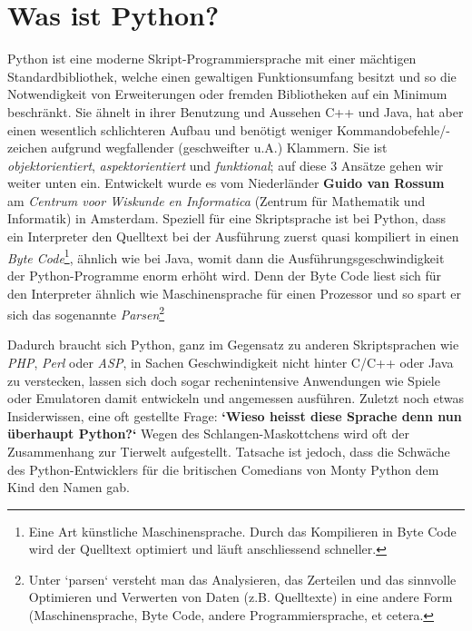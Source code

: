 \documentclass[b5paper,10pt,dvips,fleqn,titlepage,twoside]{book}
\begin{document}
\section{Was ist Python?}
Python ist eine moderne Skript-Programmiersprache mit einer mächtigen Standardbibliothek, welche einen gewaltigen Funktionsumfang besitzt und so die Notwendigkeit von Erweiterungen oder fremden Bibliotheken auf ein Minimum beschränkt. Sie ähnelt in ihrer Benutzung und Aussehen C++ und Java, hat aber einen wesentlich schlichteren Aufbau und benötigt weniger Kommandobefehle/-zeichen aufgrund wegfallender (geschweifter u.A.) Klammern.\newline
Sie ist \emph{objektorientiert}, \emph{aspektorientiert} und \emph{funktional}; auf diese 3 Ansätze gehen wir weiter unten ein.
Entwickelt wurde es vom Niederländer \textbf{Guido van Rossum} am \emph{Centrum voor Wiskunde en Informatica} (Zentrum für Mathematik und Informatik) in Amsterdam.\newline
Speziell für eine Skriptsprache ist bei Python, dass ein Interpreter den Quelltext bei der Ausführung zuerst quasi kompiliert in einen \emph{Byte Code}\footnote{Eine Art künstliche Maschinensprache. Durch das Kompilieren in Byte Code wird der Quelltext optimiert und läuft anschliessend schneller.}, ähnlich wie bei Java, womit dann die Ausführungsgeschwindigkeit der Python-Programme enorm erhöht wird. Denn der Byte Code liest sich für den Interpreter ähnlich wie Maschinensprache für einen Prozessor und so spart er sich das sogenannte \emph{Parsen}\footnote{Unter `parsen` versteht man das Analysieren, das Zerteilen und das sinnvolle Optimieren und Verwerten von Daten (z.B. Quelltexte) in eine andere Form (Maschinensprache, Byte Code, andere Programmiersprache, et cetera.}\newline

Dadurch braucht sich Python, ganz im Gegensatz zu anderen Skriptsprachen wie \emph{PHP}, \emph{Perl} oder \emph{ASP}, in Sachen Geschwindigkeit nicht hinter C/C++ oder Java zu verstecken, lassen sich doch sogar rechenintensive Anwendungen wie Spiele oder Emulatoren damit entwickeln und angemessen ausführen.\newline
Zuletzt noch etwas Insiderwissen, eine oft gestellte Frage: \textbf{`Wieso heisst diese Sprache denn nun überhaupt Python?`}\newline
Wegen des Schlangen-Maskottchens wird oft der Zusammenhang zur Tierwelt aufgestellt. Tatsache ist jedoch, dass die Schwäche des Python-Entwicklers für die britischen Comedians von Monty Python dem Kind den Namen gab.\newline\newpage
\end{document}
